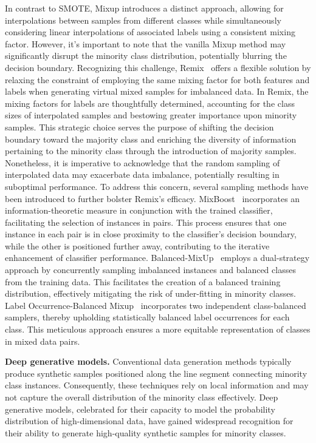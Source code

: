 In contrast to SMOTE, Mixup introduces a distinct approach, allowing for interpolations between samples from different classes while simultaneously considering linear interpolations of associated labels using a consistent mixing factor. However, it's important to note that the vanilla Mixup method may significantly disrupt the minority class distribution, potentially blurring the decision boundary. Recognizing this challenge, Remix~\cite{chou2020remix} offers a flexible solution by relaxing the constraint of employing the same mixing factor for both features and labels when generating virtual mixed samples for imbalanced data. In Remix, the mixing factors for labels are thoughtfully determined, accounting for the class sizes of interpolated samples and bestowing greater importance upon minority samples. This strategic choice serves the purpose of shifting the decision boundary toward the majority class and enriching the diversity of information pertaining to the minority class through the introduction of majority samples. 
Nonetheless, it is imperative to acknowledge that the random sampling of interpolated data may exacerbate data imbalance, potentially resulting in suboptimal performance. To address this concern, several sampling methods have been introduced to further bolster Remix's efficacy. MixBoost~\cite{kabra2020mixboost} incorporates an information-theoretic measure in conjunction with the trained classifier, facilitating the selection of instances in pairs. This process ensures that one instance in each pair is in close proximity to the classifier's decision boundary, while the other is positioned further away, contributing to the iterative enhancement of classifier performance. Balanced-MixUp~\cite{galdran2021balanced} employs a dual-strategy approach by concurrently sampling imbalanced instances and balanced classes from the training data. This facilitates the creation of a balanced training distribution, effectively mitigating the risk of under-fitting in minority classes. Label Occurrence-Balanced Mixup~\cite{9746299} incorporates two independent class-balanced samplers, thereby upholding statistically balanced label occurrences for each class. This meticulous approach ensures a more equitable representation of classes in mixed data pairs.



\textbf{Deep generative models.}
Conventional data generation methods typically produce synthetic samples positioned along the line segment connecting minority class instances. Consequently, these techniques rely on local information and may not capture the overall distribution of the minority class effectively. Deep generative models, celebrated for their capacity to model the probability distribution of high-dimensional data, have gained widespread recognition for their ability to generate high-quality synthetic samples for minority classes.

